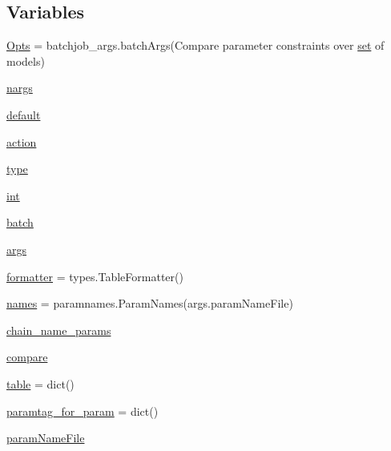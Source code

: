 \subsection*{Variables}
\begin{DoxyCompactItemize}
\item 
\mbox{\hyperlink{namespacemakeParamCompare_af087680892d7eae1aa16d78a7d216d58}{Opts}} = batchjob\+\_\+args.\+batch\+Args(\textquotesingle{}Compare parameter constraints over \mbox{\hyperlink{plotTT_8m_ae2445b699d1845d6abd1418ca39394c0}{set}} of models\textquotesingle{})
\item 
\mbox{\hyperlink{namespacemakeParamCompare_a2fcca9b4ec303cf7e6a468357dfc6352}{nargs}}
\item 
\mbox{\hyperlink{namespacemakeParamCompare_ab7e9d22fd1e1c6a6cf2247ac2ded6de6}{default}}
\item 
\mbox{\hyperlink{namespacemakeParamCompare_a8ffeeb6fb7f17f56931b3e547f8e7fd8}{action}}
\item 
\mbox{\hyperlink{namespacemakeParamCompare_a42ba48ed21c3647760778fd59e4f0ca4}{type}}
\item 
\mbox{\hyperlink{namespacemakeParamCompare_a789656ba2dd57f54cf2b875825795c01}{int}}
\item 
\mbox{\hyperlink{namespacemakeParamCompare_abbe5abdb534d52b49554f0d9cb75209d}{batch}}
\item 
\mbox{\hyperlink{namespacemakeParamCompare_affc6e96b1669030c19ab328aaddc0178}{args}}
\item 
\mbox{\hyperlink{namespacemakeParamCompare_a3e755bc2f3d4d73bfd8a68ab1ee09b90}{formatter}} = types.\+Table\+Formatter()
\item 
\mbox{\hyperlink{namespacemakeParamCompare_ad4f0258d00a578670f8c4ed0fd6752e1}{names}} = paramnames.\+Param\+Names(args.\+param\+Name\+File)
\item 
\mbox{\hyperlink{namespacemakeParamCompare_a7894657867410bfd87c5040ef10b680d}{chain\+\_\+name\+\_\+params}}
\item 
\mbox{\hyperlink{namespacemakeParamCompare_a15ac60fce66df19e01184c7059bab691}{compare}}
\item 
\mbox{\hyperlink{namespacemakeParamCompare_a0aaa9db629ff499211c8f1c14411e01c}{table}} = dict()
\item 
\mbox{\hyperlink{namespacemakeParamCompare_a16e2e744a202e572df85fac7236e8985}{paramtag\+\_\+for\+\_\+param}} = dict()
\item 
\mbox{\hyperlink{namespacemakeParamCompare_a07a793c2299633ce0109c02abbfcf77c}{param\+Name\+File}}
\item 

\end{DoxyCompactItemize}
